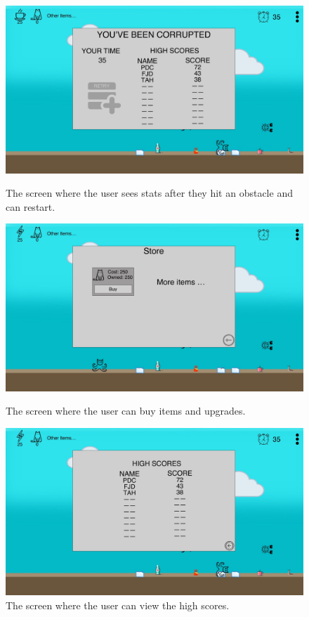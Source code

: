 \documentclass[10pt,conference,onecolumn,compsoc]{IEEEtran}
\begin{document}
\begin{figure}[h!]
\centering
\includegraphics[scale=.2]{MockupEndgame.jpeg}
\caption{The screen where the user sees stats after they hit an obstacle and can restart.}

\includegraphics[scale=.2]{MockupStore.jpeg}
\caption{The screen where the user can buy items and upgrades.}

\includegraphics[scale=.2]{MockupHighscores.jpeg}
\caption{The screen where the user can view the high scores.}

\end{figure}

\end{document}
